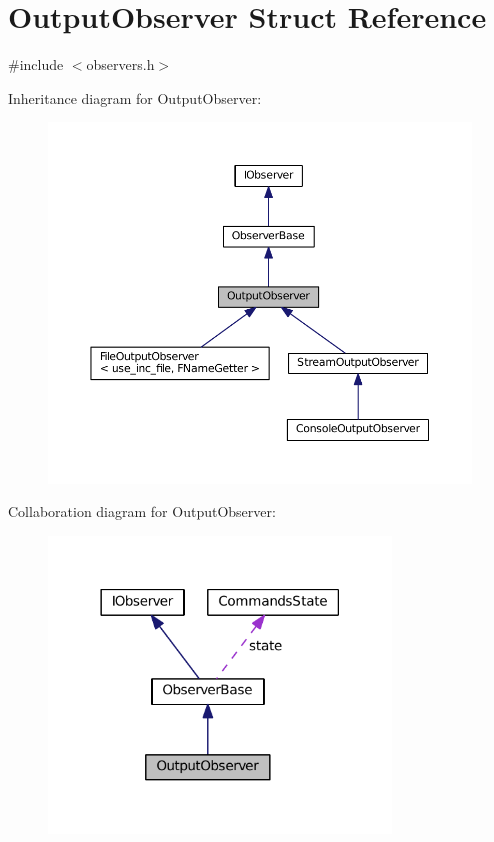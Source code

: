 \hypertarget{struct_output_observer}{}\section{Output\+Observer Struct Reference}
\label{struct_output_observer}


{\ttfamily \#include $<$observers.\+h$>$}



Inheritance diagram for Output\+Observer\+:
\nopagebreak
\begin{figure}[H]
\begin{center}
\leavevmode
\includegraphics[width=350pt]{struct_output_observer__inherit__graph}
\end{center}
\end{figure}


Collaboration diagram for Output\+Observer\+:
\nopagebreak
\begin{figure}[H]
\begin{center}
\leavevmode
\includegraphics[width=258pt]{struct_output_observer__coll__graph}
\end{center}
\end{figure}
